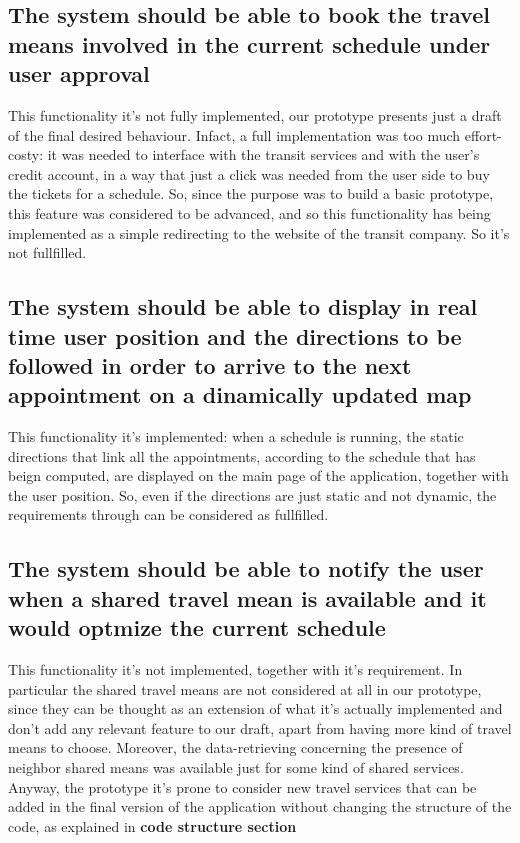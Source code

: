 \subsection{The system should be able to book the travel means involved in the current schedule under user approval} \label{subsect:gScheduleSelection}
This functionality it's not fully implemented, our prototype presents just a draft of the final desired behaviour. Infact, a full implementation was too much effort-costy: it was needed to interface with the transit services and with the user's credit account, in a way that just a click was needed from the user side to buy the tickets for a schedule. So, since the purpose was to build a basic prototype, this feature was considered to be advanced, and so this functionality has being implemented as a simple redirecting to the website of the transit company. So  it's not fullfilled.

\subsection{The system should be able to display in real time user position and the directions to be followed in order to arrive to the next appointment on a dinamically updated map} \label{subsect:gDirections}
This functionality it's implemented: when a schedule is running, the static directions that link all the appointments, according to the schedule that has beign computed, are displayed on the main page of the application, together with the user position. So, even if the directions are just static and not dynamic, the requirements  through  can be considered as fullfilled.

\subsection{The system should be able to notify the user when a shared travel mean is available and it would optmize the current schedule} \label{subsect:gSharedTMNotifications}
This functionality it's not implemented, together with it's requirement. In particular the shared travel means are not considered at all in our prototype, since they can be thought as an extension of what it's actually implemented and don't add any relevant feature to our draft, apart from having more kind of travel means to choose. Moreover, the data-retrieving concerning the presence of neighbor shared means was available just for some kind of shared services. 
Anyway, the prototype it's prone to consider new travel services that can be added in the final version of the application without changing the structure of the code, as explained in \textbf{code structure section}
